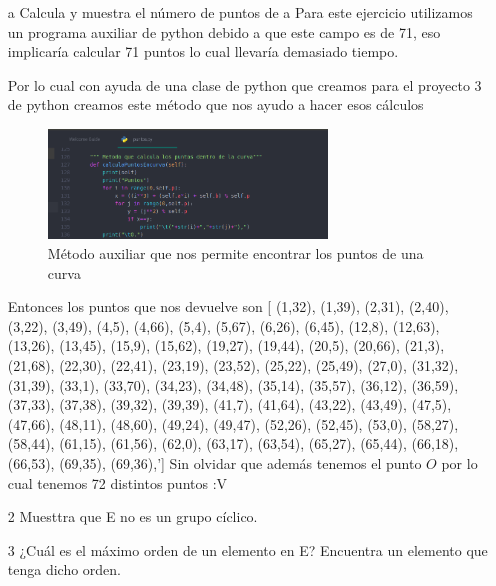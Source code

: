 \documentclass[10pt,a4paper]{article}
\begin{document}
\begin{itemize}
\item[a] Calcula y muestra el número de puntos de a
Para este ejercicio utilizamos un programa auxiliar de python debido a que este campo es de 71, eso implicaría calcular 71 puntos lo cual llevaría demasiado tiempo.\vspace{.3cm}

Por lo cual con ayuda de una clase de python que creamos para el proyecto 3 de python  creamos este método que nos ayudo a hacer esos cálculos
\begin{center}

\begin{figure}
\includegraphics[width=0.7\textwidth]{Ejemplo1.png}
\caption{Método auxiliar que nos permite encontrar los puntos de una curva}
\label{fig:metoo auxiliar}
\end{figure} 
\end{center}	   
Entonces los puntos que nos devuelve son 
[ (1,32),   (1,39),   (2,31),   (2,40),   (3,22),   (3,49),   (4,5),   (4,66),   (5,4),   (5,67),   (6,26),   (6,45),   (12,8),   (12,63),   (13,26),   (13,45),   (15,9),   (15,62),   (19,27),   (19,44),   (20,5),   (20,66),   (21,3),   (21,68),   (22,30),   (22,41),   (23,19),   (23,52),   (25,22),   (25,49),   (27,0),   (31,32),   (31,39),   (33,1),   (33,70),   (34,23),   (34,48),   (35,14),   (35,57),   (36,12),   (36,59),   (37,33),   (37,38),   (39,32),   (39,39),   (41,7),   (41,64),   (43,22),   (43,49),   (47,5),   (47,66),   (48,11),   (48,60),   (49,24),   (49,47),   (52,26),   (52,45),   (53,0),   (58,27),   (58,44),   (61,15),   (61,56),   (62,0),   (63,17),   (63,54),   (65,27),   (65,44),   (66,18),   (66,53),   (69,35),   (69,36),'] Sin olvidar que además tenemos el punto $O$ por lo cual tenemos 72 distintos puntos :V 

\item[2] Muesttra que E no es un grupo cíclico.

\item[3] ¿Cuál es el máximo orden de un elemento en E? Encuentra un elemento que tenga dicho orden.


\end{itemize}
\end{document}
